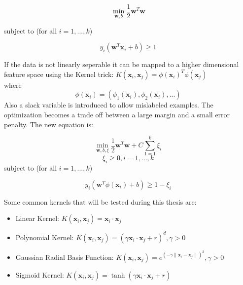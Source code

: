 \documentclass{article}
\begin{document}
\begin{equation}
\min_{\textbf{w},b} \dfrac{1}{2}\textbf{w}^{T}\textbf{w}
\end{equation}

subject to (for all $ i = 1,...,k $)

\begin{equation*}
y_{i}(\textbf{w}^{T}\textbf{x}_{i} + b) \geq 1
\end{equation*}

If the data is not linearly seperable it can be mapped to a higher dimensional feature space using the Kernel trick: $ K(\textbf{x}_{i},\textbf{x}_{j}) = \phi(\textbf{x}_{i})^{T}\phi(\textbf{x}_{j}) $ \\
where
\begin{equation*}
\phi(\textbf{x}_{i}) = (\phi_{1}(\textbf{x}_{i}), \phi_{2}(\textbf{x}_{i}),...)
\end{equation*}
Also a slack variable is introduced to allow mislabeled examples. The optimization becomes a trade off between a large margin and a small error penalty. The new equation is:

\begin{equation}
\min_{\textbf{w},b, \xi} \dfrac{1}{2}\textbf{w}^{T}\textbf{w} + C\sum_{1 = 1}^{k}\xi_{i}
\end{equation}
\begin{equation*}
\xi_{i} \geq 0, i = 1,...,k
\end{equation*}
subject to (for all $ i = 1,...,k $)

\begin{equation*}
y_{i}(\textbf{w}^{T}\phi(\textbf{x}_{i}) + b) \geq 1 - \xi_{i}
\end{equation*}

Some common kernels that will be tested during this thesis are:
\begin{itemize}
\item Linear Kernel: $K(\textbf{x}_i,\textbf{x}_{j}) = \textbf{x}_i\cdot\textbf{x}_{j}$

\item Polynomial Kernel: $K(\textbf{x}_i,\textbf{x}_{j}) = (\gamma\textbf{x}_i\cdot\textbf{x}_{j} + r)^d, \gamma > 0$

\item Gaussian Radial Basis Function: $K(\textbf{x}_i,\textbf{x}_{j}) = e^{(-\gamma\|\textbf{x}_i-\textbf{x}_{j}\|)^2}, \gamma > 0$

\item Sigmoid Kernel: $K(\textbf{x}_i,\textbf{x}_{j}) = \tanh(\gamma\textbf{x}_i\cdot\textbf{x}_{j} + r)$
\end{itemize}
\end{document}
